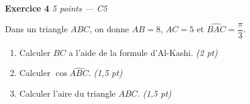 \bigskip

\textbf{Exercice 4} \hfill \textit{5 points — C5}

Dans un triangle $ABC$, on donne $AB = 8$, $AC = 5$ et $\widehat{BAC} = \dfrac{\pi}{3}$.

\begin{enumerate}
  \item Calculer $BC$ a l'aide de la formule d'Al-Kashi. \hfill \textit{(2 pt)}
  \item Calculer $\cos\widehat{ABC}$. \hfill \textit{(1,5 pt)}
  \item Calculer l'aire du triangle $ABC$. \hfill \textit{(1,5 pt)}
\end{enumerate}

